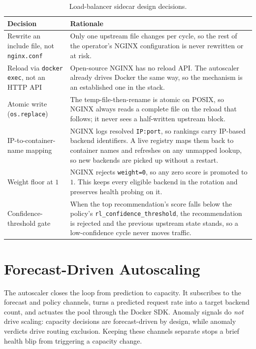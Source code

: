 \begin{table}[H]
  \centering
  \caption[Load-balancer sidecar design decisions]{Load-balancer sidecar design decisions.}
  \label{tab:imb:sidecar}
  \small
  \begin{tabularx}{\linewidth}{@{}p{4.0cm}Y@{}}
    \toprule
    \headrow
    \textbf{Decision} & \textbf{Rationale} \\
    \midrule
    Rewrite an include file, not \texttt{nginx.conf}
      & Only one upstream file changes per cycle, so the rest of the operator's
        NGINX configuration is never rewritten or at risk. \\
    \addlinespace
    Reload via \texttt{docker exec}, not an HTTP API
      & Open-source NGINX has no reload API. The autoscaler already drives Docker
        the same way, so the mechanism is an established one in the stack. \\
    \addlinespace
    Atomic write (\texttt{os.replace})
      & The temp-file-then-rename is atomic on POSIX, so NGINX always reads a
        complete file on the reload that follows; it never sees a half-written
        upstream block. \\
    \addlinespace
    IP-to-container-name mapping
      & NGINX logs resolved \texttt{IP:port}, so rankings carry IP-based backend
        identifiers. A live registry maps them back to container names and
        refreshes on any unmapped lookup, so new backends are picked up without a
        restart. \\
    \addlinespace
    Weight floor at $1$
      & NGINX rejects \texttt{weight=0}, so any zero score is promoted to $1$.
        This keeps every eligible backend in the rotation and preserves health
        probing on it. \\
    \addlinespace
    Confidence-threshold gate
      & When the top recommendation's score falls below the policy's
        \texttt{rl\_confidence\_threshold}, the recommendation is rejected and the
        previous upstream state stands, so a low-confidence cycle never moves
        traffic. \\
    \bottomrule
  \end{tabularx}
\end{table}

\section{Forecast-Driven Autoscaling}\label{imb:autoscaler}

The autoscaler closes the loop from prediction to capacity. It subscribes to the
forecast and policy channels, turns a predicted request rate into a target backend
count, and actuates the pool through the Docker SDK. Anomaly signals do \emph{not}
drive scaling: capacity decisions are forecast-driven by design, while anomaly
verdicts drive routing exclusion. Keeping these channels separate stops a brief
health blip from triggering a capacity change.

